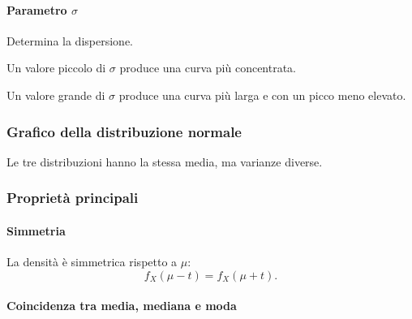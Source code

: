 \paragraph{Parametro $\sigma$}

Determina la dispersione.

Un valore piccolo di $\sigma$
produce una curva più concentrata.

Un valore grande di $\sigma$
produce una curva più larga
e con un picco meno elevato.

\subsubsection{Grafico della distribuzione normale}

\begin{center}
\end{center}

Le tre distribuzioni hanno
la stessa media, ma varianze diverse.

\subsubsection{Proprietà principali}

\paragraph{Simmetria}

La densità è simmetrica
rispetto a $\mu$:
\[
f_X(\mu-t)=f_X(\mu+t).
\]

\paragraph{Coincidenza tra media, mediana e moda}

